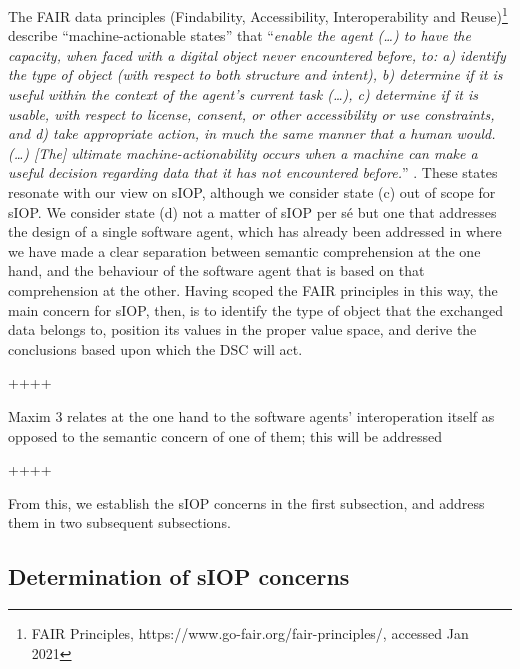 \documentclass[sort&compress,preprint,authoryear,3p,twocolumn]{elsarticle}
\begin{document}
The FAIR data principles (Findability, Accessibility, Interoperability
and Reuse)\footnote{FAIR Principles,
  https://www.go-fair.org/fair-principles/, accessed Jan 2021} describe
``machine-actionable states'' that ``\emph{enable the agent (\ldots) to
have the capacity, when faced with a digital object never encountered
before, to: a) identify the type of object (with respect to both
structure and intent), b) determine if it is useful within the context
of the agent's current task (\ldots), c) determine if it is usable, with
respect to license, consent, or other accessibility or use constraints,
and d) take appropriate action, in much the same manner that a human
would. (\ldots) {[}The{]} ultimate machine-actionability occurs when a
machine can make a useful decision regarding data that it has not
encountered before.}'' \citep{Wilkinson2016}. These states resonate with
our view on sIOP, although we consider state (c) out of scope for sIOP.
We consider state (d) not a matter of sIOP per sé but one that addresses
the design of a single software agent, which has already been addressed
in \citep[DP 2]{Brandt2021a} where we have made a clear separation
between semantic comprehension at the one hand, and the behaviour of the
software agent that is based on that comprehension at the other. Having
scoped the FAIR principles in this way, the main concern for sIOP, then,
is to identify the type of object that the exchanged data belongs to,
position its values in the proper value space, and derive the
conclusions based upon which the DSC will act.

++++

Maxim 3 relates at the one hand to the software agents' interoperation
itself as opposed to the semantic concern of one of them; this will be
addressed

++++

From this, we establish the sIOP concerns in the first subsection, and
address them in two subsequent subsections.

\hypertarget{determination-of-siop-concerns}{%
\subsection{Determination of sIOP
concerns}\label{determination-of-siop-concerns}}
\end{document}
